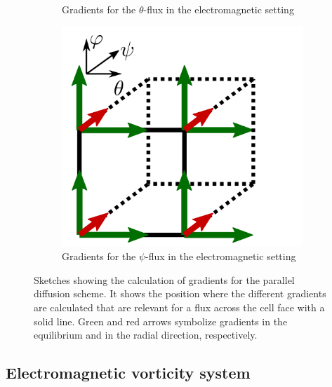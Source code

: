 \begin{figure}[!h]
\begin{subfigure}[t]{0.32\textwidth}
		\caption{ Gradients for the $\theta$-flux in the electromagnetic setting   }
		\label{fig:Gunter3D_theta} 
	\end{subfigure}
	\begin{subfigure}[t]{0.32\textwidth}
		\centering
		\includegraphics[width=\textwidth]{schemes/Gunter3D_psi.png}
		\caption{ Gradients for the $\psi$-flux in the electromagnetic setting   }
		\label{fig:GunterD_psi}
	\end{subfigure}
	\caption{Sketches showing the calculation of gradients for the parallel diffusion scheme. It shows the position where the different gradients are calculated that are relevant for a flux across the cell face with a solid line. Green and red arrows symbolize gradients in the equilibrium and in the radial direction, respectively.}
	\label{fig:GunterStencils_flutter}
\end{figure}


\subsection{Electromagnetic vorticity system}

